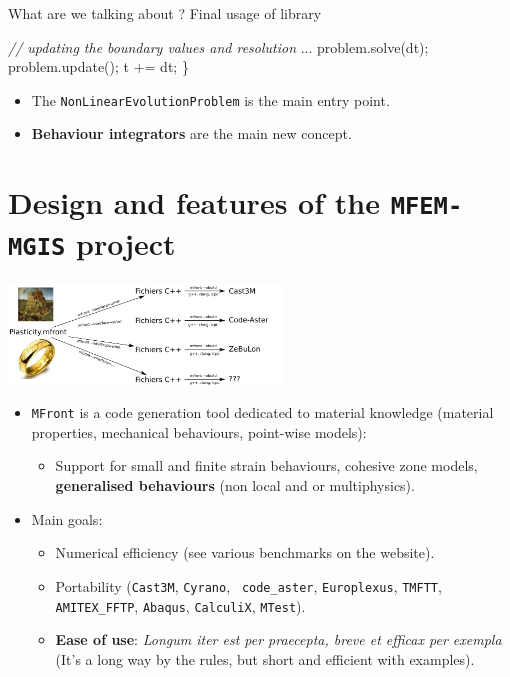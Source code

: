 \documentclass{beamer}
\newcommand{\CommentTok}[1]{\textcolor[rgb]{0.38,0.63,0.69}{\textit{#1}}}
\newcommand{\NormalTok}[1]{#1}
\begin{document}
\begin{frame}[fragile]{What are we talking about ? Final usage of library}
\begin{center}
\begin{minipage}{\linewidth}
\begin{Highlighting}[]
        \CommentTok{  // updating the boundary values and resolution}
        \NormalTok{  ...}
        \NormalTok{  problem.solve(dt);}
        \NormalTok{  problem.update();}
        \NormalTok{  t += dt;}
        \NormalTok{\}}
      \end{Highlighting}
    \end{minipage}
  \end{center}
  \begin{itemize}
    \item The \texttt{NonLinearEvolutionProblem} is the
    main entry point.
    \item \textbf{Behaviour integrators} are the main new
    concept.
  \end{itemize}
\end{frame}

\section{Design and features of the \texttt{MFEM-MGIS} project}

\begin{frame}
  \begin{center}
    \includegraphics[width=0.55\textwidth]{img/MFrontPrinciple.pdf}
  \end{center}
  \begin{itemize}
    \item {\tt MFront} is a code generation tool dedicated to
    material knowledge (material properties, mechanical behaviours,
    point-wise models):
    \begin{itemize}
      \item Support for small and finite strain behaviours,
      cohesive zone models, {\bf generalised behaviours} (non local and
      or multiphysics).
    \end{itemize}
    \item Main goals:
    \begin{itemize}
      \item Numerical efficiency (see various benchmarks on
      the website).
      \item Portability ({\tt Cast3M}, {\tt Cyrano}, {\tt
        code\_aster}, {\tt Europlexus}, {\tt TMFTT}, {\tt AMITEX\_FFTP},
      {\tt Abaqus}, {\tt CalculiX}, {\tt MTest}).
      \item {\bf Ease of use}: {\em Longum iter est per
        praecepta, breve et efficax per exempla} (It's a long way by the
      rules, but short and efficient with examples).
    \end{itemize}
  \end{itemize}
\end{frame}
\end{document}
